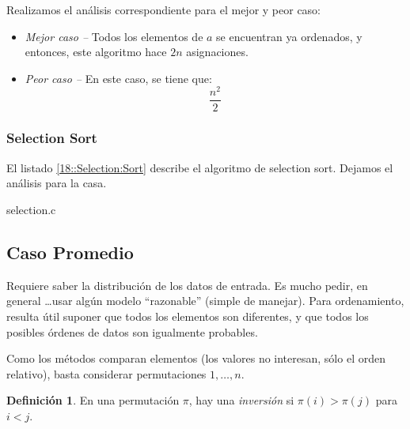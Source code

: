 \documentclass[english, spanish, fleqn, 10pt]{article}
\newcommand{\comillas}[1]{``#1''}
\numberwithin{equation}{section}
\newcommand{\nparentesis}[1]{\left( #1 \right)}
\theoremstyle{definition}
\newtheorem{definition}{Definición}[section]
\begin{document}
Realizamos el análisis correspondiente para el mejor y peor caso:
\begin{itemize}
	\item \emph{Mejor caso -- } Todos los elementos de $a$ se encuentran ya ordenados, y entonces, este algoritmo hace $2n$ asignaciones.
	
	\item \emph{Peor caso -- } En este caso, se tiene que:
	\begin{equation*}
		\dfrac{n^2}{2}
	\end{equation*}
\end{itemize}

\subsubsection{Selection Sort}
El listado \ref{18::Selection:Sort} describe el algoritmo de selection sort. Dejamos el análisis para la casa.

{selection.c}


\subsection{Caso Promedio}
Requiere saber la distribución de los datos de entrada. Es mucho pedir, en general \ldots usar algún modelo \comillas{razonable} (simple de manejar). Para ordenamiento, resulta útil suponer que todos los elementos son diferentes, y que todos los posibles órdenes de datos son igualmente probables.

Como los métodos comparan elementos (los valores no interesan, sólo el orden relativo), basta considerar permutaciones $1, \ldots, n$.

\begin{definition}
	En una permutación $\pi$, hay una \emph{inversión} si $\pi\nparentesis{i}  > \pi\nparentesis{j}$ para $i < j$.
\end{definition}
\end{document}
